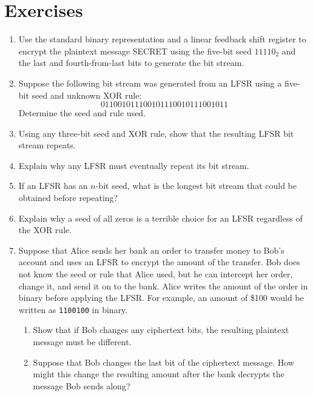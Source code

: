 \documentclass{book}
\theoremstyle{plain}
\theoremstyle{definition}
\newif\ifprintsolutions
\newcommand{\solution}[1]{\ifprintsolutions \begin{sloppypar}{\it #1}\end{sloppypar} \fi} %
\newcommand{\ciphertext}[1]{\texttt{#1}} %
\begin{document}
\section{Exercises}
\begin{enumerate}
\item Use the standard binary representation and a linear feedback shift register to encrypt the plaintext message SECRET using the five-bit seed $11110_2$ and the last and fourth-from-last bits to generate the bit stream. \solution{Bit stream $111101011001000111101011001000$, ciphertext \ciphertext{MSKPS,}}
\item Suppose the following bit stream was generated from an LFSR using a five-bit seed and unknown XOR rule: $$011001011100101110010111001011$$ Determine the seed and rule used. \solution{The seed is $01100_2$. The rule is to XOR the last, second-from-last, and fourth-from-last bits.}
\item Using any three-bit seed and XOR rule, show that the resulting LFSR bit stream repeats.
\item Explain why any LFSR must eventually repeat its bit stream. \solution{There are a finite number of states.}
\item If an LFSR has an $n$-bit seed, what is the longest bit stream that could be obtained before repeating? \solution{$2^n$ bits}
\item Explain why a seed of all zeros is a terrible choice for an LFSR regardless of the XOR rule. \solution{The resulting bit stream is all zeros.}
\item Suppose that Alice sends her bank an order to transfer money to Bob's account and uses an LFSR to encrypt the amount of the transfer. Bob does not know the seed or rule that Alice used, but he can intercept her order, change it, and send it on to the bank. Alice writes the amount of the order in binary before applying the LFSR. For example, an amount of \$100 would be written as \ciphertext{1100100} in binary.
\begin{enumerate}
\item Show that if Bob changes any ciphertext bits, the resulting plaintext message must be different. \solution{If $a \oplus b = x$, then $a \oplus (1-b) = (1-x)$.}
\item Suppose that Bob changes the last bit of the ciphertext message. How might this change the resulting amount after the bank decrypts the message Bob sends along? \solution{The amount will either increase or decrease by one dollar, depending on the original bit and the corresponding key bit.}

\end{enumerate}
\end{enumerate}
\end{document}

